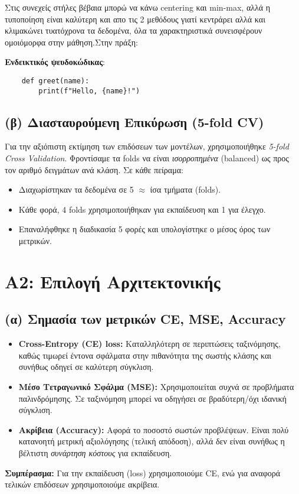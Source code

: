 \documentclass[a4paper,11pt]{article}
\begin{document}
Στις συνεχείς στήλες βέβαια μπορώ να κάνω  centering και min-max, αλλά η τυποποίηση είναι καλύτερη και απο τις 2 μεθόδους γιατί κεντράρει αλλά και κλιμακώνει τυατόχρονα 
τα δεδομένα, όλα τα χαρακτηριστικά συνεισφέρουν ομοιόμορφα στην μάθηση.Στην πράξη:


\noindent
\textbf{Ενδεικτικός ψευδοκώδικας}:
\begin{verbatim}
    def greet(name):
        print(f"Hello, {name}!")
    \end{verbatim}
    

\subsection{(β) Διασταυρούμενη Επικύρωση (5-fold CV)}
Για την αξιόπιστη εκτίμηση των επιδόσεων των μοντέλων, χρησιμοποιήθηκε \emph{5-fold
Cross Validation}. Φροντίσαμε τα folds να είναι \emph{ισορροπημένα} (balanced) ως προς
τον αριθμό δειγμάτων ανά κλάση. Σε κάθε πείραμα:
\begin{itemize}
    \item Διαχωρίστηκαν τα δεδομένα σε 5 $\approx$ ίσα τμήματα (folds).
    \item Κάθε φορά, 4 folds χρησιμοποιήθηκαν για εκπαίδευση και 1 για έλεγχο.
    \item Επαναλήφθηκε η διαδικασία 5 φορές και υπολογίστηκε ο μέσος όρος των μετρικών.
\end{itemize}

\section{A2: Επιλογή Αρχιτεκτονικής}

\subsection{(α) Σημασία των μετρικών CE, MSE, Accuracy}
\begin{itemize}
  \item \textbf{Cross-Entropy (CE) loss:} Καταλληλότερη σε περιπτώσεις ταξινόμησης, καθώς τιμωρεί έντονα σφάλματα στην πιθανότητα της σωστής κλάσης και συνήθως οδηγεί σε καλύτερη σύγκλιση.
  \item \textbf{Μέσο Τετραγωνικό Σφάλμα (MSE):} Χρησιμοποιείται συχνά σε προβλήματα παλινδρόμησης. Σε ταξινόμηση μπορεί να οδηγήσει σε βραδύτερη/όχι ιδανική σύγκλιση.
  \item \textbf{Ακρίβεια (Accuracy):} Αφορά το ποσοστό σωστών προβλέψεων. Είναι πολύ κατανοητή μετρική αξιολόγησης (τελική απόδοση), αλλά δεν είναι συνήθως η βέλτιστη \emph{συνάρτηση κόστους} για εκπαίδευση.
\end{itemize}
\noindent
\textbf{Συμπέρασμα:} Για την εκπαίδευση (loss) χρησιμοποιούμε CE, ενώ για αναφορά
τελικών επιδόσεων χρησιμοποιούμε ακρίβεια.
\end{document}

